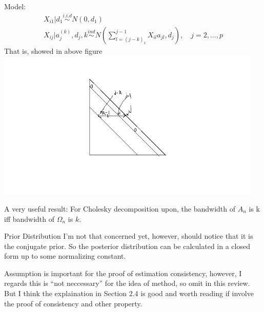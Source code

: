 \documentclass{beamer}
\begin{document}
\begin{frame}
Model: \[
\begin{array}
{ c } { X _ { i 1 } | d _ { 1 } \overset { i . i . d } { \sim } N \left( 0 , d _ { 1 } \right) } \\ 
{ X _ { i j } | a _ { j } ^ { ( k ) } , d _ { j } , k \overset { i n d } { \sim } N \left( \sum _ { l = ( j - k ) _ { 1 } } ^ { j - 1 } X _ { i l } a _ { j l } , d _ { j } \right) , \quad j = 2 , \ldots , p} 
\end{array}
\] That is, showed in above figure 
\includegraphics[width=5in]{bandedMatrix.png} 
\end{frame}




\begin{frame}
A very useful result: For Cholesky decomposition upon, the bandwidth of
\(A_n\) is k iff bandwidth of \(\Omega_n\) is \(k\).

Prior Distribution I'm not that concerned yet, however, should notice
that it is the conjugate prior. So the posterior distribution can be
calculated in a closed form up to some normalizing constant.

Assumption is important for the proof of estimation consistency,
however, I regards this is ``not neccessary'' for the idea of method, so
omit in this review. But I think the explaination in Section 2.4 is good
and worth reading if involve the proof of consistency and other
property.
\end{frame}
\end{document}
